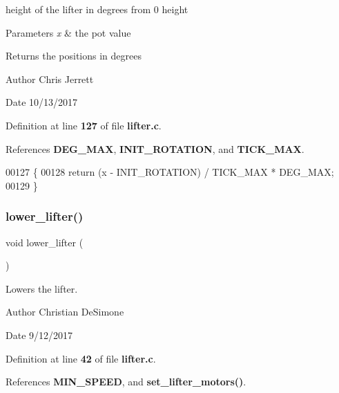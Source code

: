 height of the lifter in degrees from 0 height 


\begin{DoxyParams}{Parameters}
{\em x} & the pot value \\
\hline
\end{DoxyParams}
\begin{DoxyReturn}{Returns}
the positions in degrees 
\end{DoxyReturn}
\begin{DoxyAuthor}{Author}
Chris Jerrett 
\end{DoxyAuthor}
\begin{DoxyDate}{Date}
10/13/2017 
\end{DoxyDate}


Definition at line \textbf{ 127} of file \textbf{ lifter.\+c}.



References \textbf{ D\+E\+G\+\_\+\+M\+AX}, \textbf{ I\+N\+I\+T\+\_\+\+R\+O\+T\+A\+T\+I\+ON}, and \textbf{ T\+I\+C\+K\+\_\+\+M\+AX}.


\begin{DoxyCode}
00127                                         \{
00128   \textcolor{keywordflow}{return} (x - INIT_ROTATION) / TICK_MAX * DEG_MAX;
00129 \}
\end{DoxyCode}
\mbox{\label{lifter_8h_aa7d2d04059f57cc5b8582f6fd0726dc1}} 
\subsubsection{lower\+\_\+lifter()}
{\footnotesize\ttfamily void lower\+\_\+lifter (\begin{DoxyParamCaption}{ }\end{DoxyParamCaption})}



Lowers the lifter. 

\begin{DoxyAuthor}{Author}
Christian De\+Simone 
\end{DoxyAuthor}
\begin{DoxyDate}{Date}
9/12/2017 
\end{DoxyDate}


Definition at line \textbf{ 42} of file \textbf{ lifter.\+c}.



References \textbf{ M\+I\+N\+\_\+\+S\+P\+E\+ED}, and \textbf{ set\+\_\+lifter\+\_\+motors()}.



